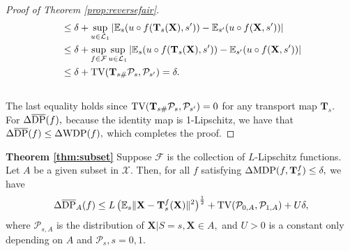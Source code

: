 \documentclass[10pt]{article} %
\begin{document}
\begin{proof}[Proof of Theorem \ref{prop:reversefair}]
\begin{equation}
\begin{split}
            & \le \delta 
            + \sup_{u \in \mathcal{L}_{1}} \left| \mathbb{E}_{s} ( u \circ f(\mathbf{T}_{s}(\mathbf{X}), s') ) - \mathbb{E}_{s'} ( u \circ f(\mathbf{X}, s') ) \right| \\
            & \le \delta + \sup_{f \in \mathcal{F}} \sup_{u \in \mathcal{L}_{1}} \left| \mathbb{E}_{s} ( u \circ f (\mathbf{T}_{s}(\mathbf{X}), s') ) - \mathbb{E}_{s'} ( u \circ f (\mathbf{X}, s') ) \right| \\
            & \le \delta + \textup{TV} ( \mathbf{T}_{s \#} \mathcal{P}_{s}, \mathcal{P}_{s'} ) = \delta.
        \end{split}
    \end{equation}
    \\
    The last equality holds since $ \textup{TV} ( \mathbf{T}_{s \#} \mathcal{P}_{s}, \mathcal{P}_{s'} ) = 0$ for any transport map $\mathbf{T}_{s}.$
    \\
    For $\Delta \overline{\textup{DP}} (f),$
    because the identity map is 1-Lipschitz, we have that $\Delta \overline{\textup{DP}}(f) \le \Delta \textup{WDP}(f),$ which completes the proof.
\end{proof}

\clearpage


\textbf{Theorem \ref{thm:subset}}
    Suppose $\mathcal{F}$ is the collection of $L$-Lipschitz functions.
    Let $A$ be a given subset in $\mathcal{X}.$
    Then, for all $f$ satisfying $\Delta \textup{MDP} (f, \mathbf{T}_{s}^{f}) \le \delta,$ we have
    \begin{equation}
        \begin{split}
            \Delta \overline{\textup{DP}}_{A} (f) 
            \le L \left( \mathbb{E}_{s} \Vert \mathbf{X} - \mathbf{T}_{s}^{f}(\mathbf{X}) \Vert^{2} \right)^{ \frac{1}{2} }
            + \textup{TV}(\mathcal{P}_{0, A}, \mathcal{P}_{1, A}) + U \delta,
        \end{split}
    \end{equation}
    where $\mathcal{P}_{s, A}$ is the distribution of $\mathbf{X} | S = s, \mathbf{X} \in A,$
    and $U > 0$ is a constant only depending on $A$ and $\mathcal{P}_{s}, s=0,1.$
\end{document}
